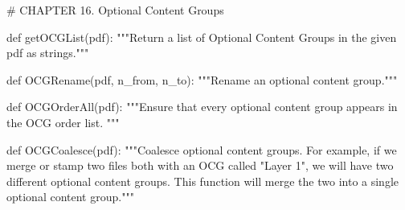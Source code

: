 # CHAPTER 16. Optional Content Groups

def getOCGList(pdf):
    """Return a list of Optional Content Groups in the given pdf as strings."""

def OCGRename(pdf, n_from, n_to):
    """Rename an optional content group."""

def OCGOrderAll(pdf):
    """Ensure that every optional content group appears in the OCG order list.
    """

def OCGCoalesce(pdf):
    """Coalesce optional content groups. For example, if we merge or stamp two
    files both with an OCG called "Layer 1", we will have two different
    optional content groups. This function will merge the two into a single
    optional content group."""
